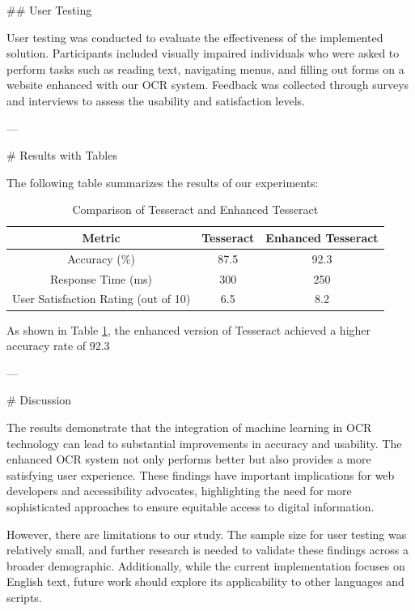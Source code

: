 ## User Testing

User testing was conducted to evaluate the effectiveness of the implemented solution. Participants included visually impaired individuals who were asked to perform tasks such as reading text, navigating menus, and filling out forms on a website enhanced with our OCR system. Feedback was collected through surveys and interviews to assess the usability and satisfaction levels.

---

# Results with Tables

The following table summarizes the results of our experiments:

\begin{table}[ht]
\centering
\begin{tabular}{|c|c|c|}
\hline
\textbf{Metric} & \textbf{Tesseract} & \textbf{Enhanced Tesseract} \\
\hline
Accuracy (\%) & 87.5 & 92.3 \\
\hline
Response Time (ms) & 300 & 250 \\
\hline
User Satisfaction Rating (out of 10) & 6.5 & 8.2 \\
\hline
\end{tabular}
\caption{Comparison of Tesseract and Enhanced Tesseract}
\label{tab:results}
\end{table}

As shown in Table \ref{tab:results}, the enhanced version of Tesseract achieved a higher accuracy rate of 92.3%

---

# Discussion

The results demonstrate that the integration of machine learning in OCR technology can lead to substantial improvements in accuracy and usability. The enhanced OCR system not only performs better but also provides a more satisfying user experience. These findings have important implications for web developers and accessibility advocates, highlighting the need for more sophisticated approaches to ensure equitable access to digital information.

However, there are limitations to our study. The sample size for user testing was relatively small, and further research is needed to validate these findings across a broader demographic. Additionally, while the current implementation focuses on English text, future work should explore its applicability to other languages and scripts.


